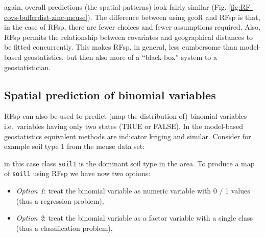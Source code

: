 \documentclass[graybox,natbib,nospthms,UStrade]{svmono}
\newenvironment{Shaded}{\begin{snugshade}}{\end{snugshade}}
\newcommand{\CommentTok}[1]{\textcolor[rgb]{0.37,0.37,0.37}{\textit{#1}}}
\newcommand{\DecValTok}[1]{\textcolor[rgb]{0.06,0.06,0.06}{#1}}
\newcommand{\KeywordTok}[1]{\textcolor[rgb]{0.27,0.27,0.27}{\textbf{#1}}}
\newcommand{\NormalTok}[1]{#1}
\newcommand{\OperatorTok}[1]{\textcolor[rgb]{0.43,0.43,0.43}{\textbf{#1}}}
\newcommand{\StringTok}[1]{\textcolor[rgb]{0.5,0.5,0.5}{#1}}
\providecommand{\tightlist}{%
  \setlength{\itemsep}{0pt}\setlength{\parskip}{0pt}}
\providecommand{\tightlist}{\setlength{\itemsep}{0pt}\setlength{\parskip}{0pt}}
\begin{document}
again, overall predictions (the spatial patterns) look fairly similar (Fig. \ref{fig:RF-covs-bufferdist-zinc-meuse}).
The difference between using geoR and RFsp is that, in the case of RFsp, there are fewer choices
and fewer assumptions required. Also, RFsp permits the relationship between covariates
and geographical distances to be fitted concurrently. This makes RFsp, in general, less
cumbersome than model-based geostatistics, but then also more of a ``black-box'' system
to a geostatistician.

\hypertarget{spatial-prediction-of-binomial-variables}{%
\subsection{Spatial prediction of binomial variables}\label{spatial-prediction-of-binomial-variables}}

RFsp can also be used to predict (map the distribution of) binomial variables i.e.~variables having only two states (TRUE or FALSE). In the model-based geostatistics equivalent methods are indicator kriging and similar. Consider for example soil type 1 from the meuse data set:

\begin{Shaded}
\end{Shaded}

in this case class \texttt{soil1} is the dominant soil type in the area. To produce a map of \texttt{soil1} using RFsp we have now two options:

\begin{itemize}
\tightlist
\item
  \emph{Option 1}: treat the binomial variable as numeric variable with 0 / 1 values (thus a regression problem),
\item
  \emph{Option 2}: treat the binomial variable as a factor variable with a single class (thus a classification problem),
\end{itemize}
\end{document}
